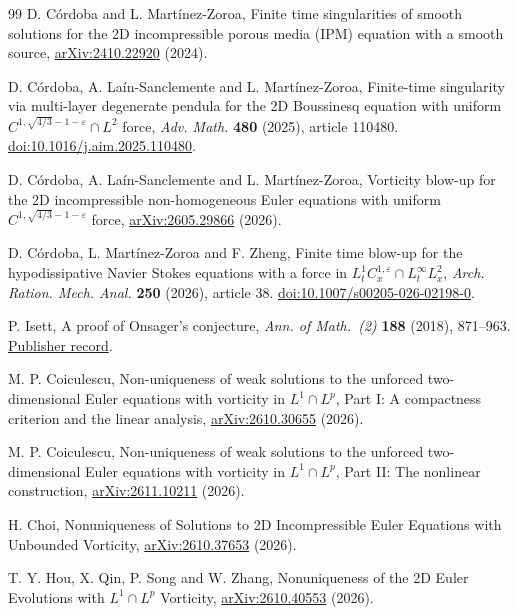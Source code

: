 \begin{thebibliography}{99}
 D. C\'ordoba and L. Mart\'inez-Zoroa,
Finite time singularities of smooth solutions for the 2D incompressible
porous media (IPM) equation with a smooth source,
\href{https://arxiv.org/abs/2410.22920}{arXiv:2410.22920} (2024).

D. C\'ordoba, A. La\'in-Sanclemente and L. Mart\'inez-Zoroa,
Finite-time singularity via multi-layer degenerate pendula for the
2D Boussinesq equation with uniform
$C^{1,\sqrt{4/3}-1-\varepsilon}\cap L^2$ force,
\emph{Adv. Math.} \textbf{480} (2025), article 110480.
\href{https://doi.org/10.1016/j.aim.2025.110480}{doi:10.1016/j.aim.2025.110480}.

D. C\'ordoba, A. La\'in-Sanclemente and L. Mart\'inez-Zoroa,
Vorticity blow-up for the 2D incompressible non-homogeneous Euler equations
with uniform $C^{1,\sqrt{4/3}-1-\varepsilon}$ force,
\href{https://arxiv.org/abs/2605.29866}{arXiv:2605.29866} (2026).

 D. C\'ordoba, L. Mart\'inez-Zoroa and F. Zheng,
Finite time blow-up for the hypodissipative Navier Stokes equations
with a force in $L_t^1 C_x^{1,\varepsilon}\cap L_t^\infty L_x^2$,
\emph{Arch. Ration. Mech. Anal.} \textbf{250} (2026), article 38.
\href{https://doi.org/10.1007/s00205-026-02198-0}{doi:10.1007/s00205-026-02198-0}.

 P. Isett, A proof of Onsager's conjecture,
\emph{Ann. of Math.~(2)} \textbf{188} (2018), 871--963.
\href{https://annals.math.princeton.edu/2018/188-3/p04}{Publisher record}.

 M. P. Coiculescu,
Non-uniqueness of weak solutions to the unforced two-dimensional Euler
equations with vorticity in $L^1\cap L^p$, Part I:
A compactness criterion and the linear analysis,
\href{https://arxiv.org/abs/2610.30655}{arXiv:2610.30655} (2026).

 M. P. Coiculescu,
Non-uniqueness of weak solutions to the unforced two-dimensional Euler
equations with vorticity in $L^1\cap L^p$, Part II:
The nonlinear construction,
\href{https://arxiv.org/abs/2611.10211}{arXiv:2611.10211} (2026).

 H. Choi,
Nonuniqueness of Solutions to 2D Incompressible Euler Equations with
Unbounded Vorticity,
\href{https://arxiv.org/abs/2610.37653}{arXiv:2610.37653} (2026).

T. Y. Hou, X. Qin, P. Song and W. Zhang,
Nonuniqueness of the 2D Euler Evolutions with $L^1\cap L^p$ Vorticity,
\href{https://arxiv.org/abs/2610.40553}{arXiv:2610.40553} (2026).


\end{thebibliography}
